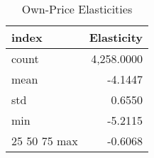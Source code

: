 \begin{table}[!htbp]
\centering
\caption{Own-Price Elasticities}
\label{tab:own_elasticities}
\begin{tabular}{lr}
\toprule
index & Elasticity \\
\midrule
count & 4,258.0000 \\
mean & -4.1447 \\
std & 0.6550 \\
min & -5.2115 \\
25%
50%
75%
max & -0.6068 \\
\bottomrule
\end{tabular}

\end{table}
